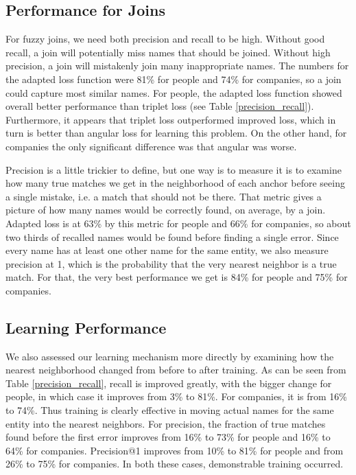 \subsection{Performance for Joins}
For fuzzy joins, we need both precision and recall to be high.  Without good recall, a join will potentially miss names that should be joined.  Without high precision, a join will mistakenly join many inappropriate names.  The numbers for the adapted loss function were 81\% for people and 74\% for companies, so a join could capture most similar names.  For people, the adapted loss function showed overall better performance than triplet loss (see Table \ref{precision_recall}).  Furthermore, it appears that triplet loss outperformed improved loss, which in turn is better than angular loss for learning this problem.  On the other hand, for companies the only significant difference was that angular was worse.

 Precision is a little trickier to define, but one way is to measure it is to examine how many true matches we get in the neighborhood of each anchor before seeing a single mistake, i.e. a match that should not be there.  That metric gives a picture of how many names would be correctly found, on average, by a join.  Adapted loss is at 63\% by this metric for people and 66\% for companies, so about two thirds of recalled names would be found before finding a single error.  Since every name has at least one other name for the same entity, we also measure precision at 1, which is the probability that the very nearest neighbor is a true match.  For that, the very best performance we get is 84\% for people and 75\% for companies.  


\subsection{Learning Performance}

 We also assessed our learning mechanism more directly by examining how the nearest neighborhood changed from before to after training.  As can be seen from Table \ref{precision_recall}, recall is improved greatly, with the bigger change for people, in which case it improves from 3\% to 81\%.  For companies, it is from 16\% to 74\%.  Thus training is clearly effective in moving actual names for the same entity into the nearest neighbors.  For precision, the fraction of true matches found before the first error improves from 16\% to 73\% for people and 16\% to 64\% for companies.  Precision@1 improves from 10\% to 81\% for people and from 26\% to 75\% for companies.  In both these cases, demonstrable training occurred.

